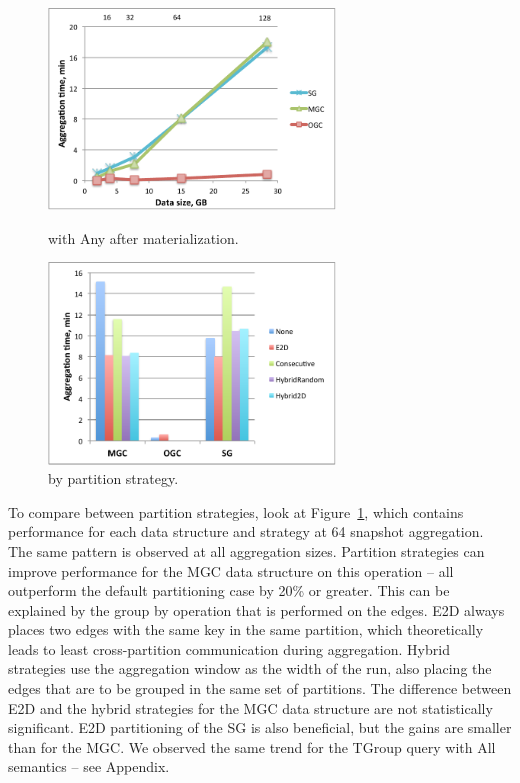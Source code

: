 \begin{figure}[t!]
\centering
\begin{minipage}{3.3in}
  \centering
  \includegraphics[width=3in]{figs/tgroupe_warm.pdf}
  \caption{ with Any after materialization.}
  \label{fig:tgroupe}
\end{minipage}
\begin{minipage}{3.3in}
  \centering
  \includegraphics[width=3in]{figs/tgroupeparts.pdf}
  \caption{ by partition strategy.}
  \label{fig:tgroupeparts}
\end{minipage}
\end{figure}

To compare between partition strategies, look at
Figure~\ref{fig:tgroupeparts}, which contains performance for each
data structure and strategy at 64 snapshot aggregation.  The same
pattern is observed at all aggregation sizes.  Partition strategies
can improve performance for the MGC data structure on this operation
-- all outperform the default partitioning case by 20\% or greater.
This can be explained by the group by operation that is performed on
the edges.  E2D always places two edges with the same key in the same
partition, which theoretically leads to least cross-partition
communication during aggregation.  Hybrid strategies use the
aggregation window as the width of the run, also placing the edges
that are to be grouped in the same set of partitions.  The difference
between E2D and the hybrid strategies for the MGC data structure are
not statistically significant.  E2D partitioning of the SG is also
beneficial, but the gains are smaller than for the MGC.  We observed
the same trend for the TGroup query with All semantics -- see
Appendix.

